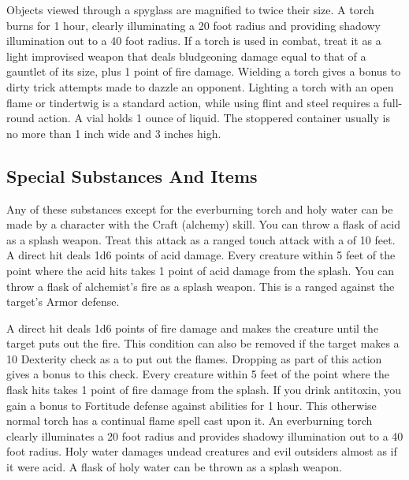          Objects viewed through a spyglass are magnified to twice their size.
         A torch burns for 1 hour, clearly illuminating a 20 foot radius and providing shadowy illumination out to a 40 foot radius. If a torch is used in combat, treat it as a light improvised weapon that deals bludgeoning damage equal to that of a gauntlet of its size, plus 1 point of fire damage. Wielding a torch gives a  bonus to dirty trick attempts made to dazzle an opponent. Lighting a torch with an open flame or tindertwig is a standard action, while using flint and steel requires a full-round action.
         A vial holds 1 ounce of liquid. The stoppered container usually is no more than 1 inch wide and 3 inches high.

    \subsection{Special Substances And Items}
        Any of these substances except for the everburning torch and holy water can be made by a character with the Craft (alchemy) skill.
         You can throw a flask of acid as a splash weapon. Treat this attack as a ranged touch attack with a  of 10 feet. A direct hit deals 1d6 points of acid damage. Every creature within 5 feet of the point where the acid hits takes 1 point of acid damage from the splash.
         You can throw a flask of alchemist's fire as a splash weapon.
        This is a ranged  against the target's Armor defense.
        \par A direct hit deals 1d6 points of fire damage and makes the creature \ignited until the target puts out the fire.
        This condition can also be removed if the target makes a  10 Dexterity check as a  to put out the flames.
        Dropping  as part of this action gives a  bonus to this check.
        Every creature within 5 feet of the point where the flask hits takes 1 point of fire damage from the splash.
         If you drink antitoxin, you gain a  bonus to Fortitude defense against  abilities for 1 hour.
         This otherwise normal torch has a continual flame spell cast upon it. An everburning torch clearly illuminates a 20 foot radius and provides shadowy illumination out to a 40 foot radius.
         Holy water damages undead creatures and evil outsiders almost as if it were acid. A flask of holy water can be thrown as a splash weapon.

